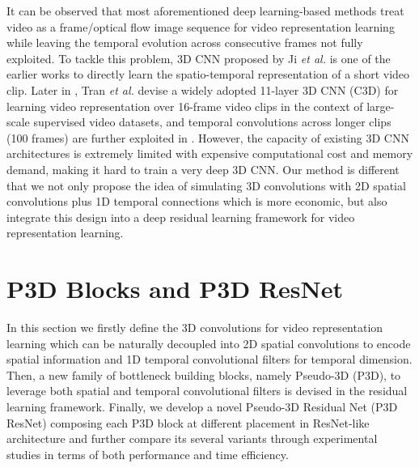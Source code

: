 \documentclass[10pt,twocolumn,letterpaper]{article}
\begin{document}
It can be observed that most aforementioned deep learning-based methods treat video as a frame/optical flow image sequence for video representation learning while leaving the temporal evolution across consecutive frames not fully exploited. To tackle this problem, 3D CNN proposed by Ji \emph{et al.} \cite{Ji:PAMI13} is one of the earlier works to directly learn the spatio-temporal representation of a short video clip. Later in \cite{tran2015learning}, Tran \emph{et al.} devise a widely adopted 11-layer 3D CNN (C3D) for learning video representation over 16-frame video clips in the context of large-scale supervised video datasets, and temporal convolutions across longer clips (100 frames) are further exploited in \cite{varol2016long}. However, the capacity of existing 3D CNN architectures is extremely limited with expensive computational cost and memory demand, making it hard to train a very deep 3D CNN. Our method is different that we not only propose the idea of simulating 3D convolutions with 2D spatial convolutions plus 1D temporal connections which is more economic, but also integrate this design into a deep residual learning framework for video representation learning.





\section{P3D Blocks and P3D ResNet}
In this section we firstly define the 3D convolutions for video representation learning which can be naturally decoupled into 2D spatial convolutions to encode spatial information and 1D temporal convolutional filters for temporal dimension. Then, a new family of bottleneck building blocks, namely Pseudo-3D (P3D), to leverage both spatial and temporal convolutional filters is devised in the residual learning framework. Finally, we develop a novel Pseudo-3D Residual Net (P3D ResNet) composing each P3D block at different placement in ResNet-like architecture and further compare its several variants through experimental studies in terms of both performance and time efficiency.
\end{document}

